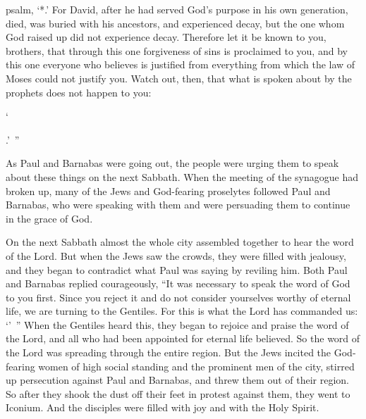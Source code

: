 {psalm, ‘{}*.’
For
David,
after he had served
God’s
purpose
in his own
generation,
died,
was buried
with
his
ancestors,
and
experienced
decay,
but
the one whom
God
raised up
did
not
experience
decay.
Therefore
let it be
known
to you,
brothers,
that
through
this
one forgiveness
of sins
is proclaimed
to you,
and
by
this
one everyone
who believes
is justified
from
everything
from which
the law
of Moses
could
not
justify you.
Watch out,
then,
that what is spoken
about by
the prophets
does
not
happen to you:
\par }{\Q {}‘{}
\par }{
\par }{.’ ”
\par }{\PP {}As Paul and Barnabas were going out,
the people were urging
them
to speak
about these things
on
the next
Sabbath.
When
the meeting of the synagogue
had broken up,
many
of the Jews
and
God-fearing
proselytes
followed
Paul
and
Barnabas,
who
were speaking
with them
and were persuading
them
to continue
in the grace
of God.
\par }{\PP {}On the next
Sabbath
almost
the whole
city
assembled together
to hear
the word
of the Lord.
But
when the Jews
saw
the crowds,
they were filled
with jealousy,
and
they began to contradict
what Paul
was saying
by
reviling him.
Both Paul
and
Barnabas
replied
courageously, “It was
necessary
to speak
the word
of God
to you
first.
Since
you reject
it
and
do
not
consider
yourselves
worthy
of eternal
life,
we are turning
to
the Gentiles.
For
this is
what the Lord
has commanded
us: ‘{}’ ”
When
the Gentiles
heard
this, they began to rejoice
and
praise
the word
of the Lord,
and
all
who had been appointed
for
eternal
life
believed.
So
the word
of the Lord
was spreading
through
the entire
region.
But
the Jews
incited
the God-fearing
women
of high social standing
and
the prominent men
of the city,
stirred up
persecution
against
Paul
and
Barnabas,
and
threw
them
out
of their
region.
So
after they shook
the dust
off their feet
in protest against
them,
they went
to
Iconium.
And
the disciples
were filled
with joy
and
with the Holy
Spirit.

}
